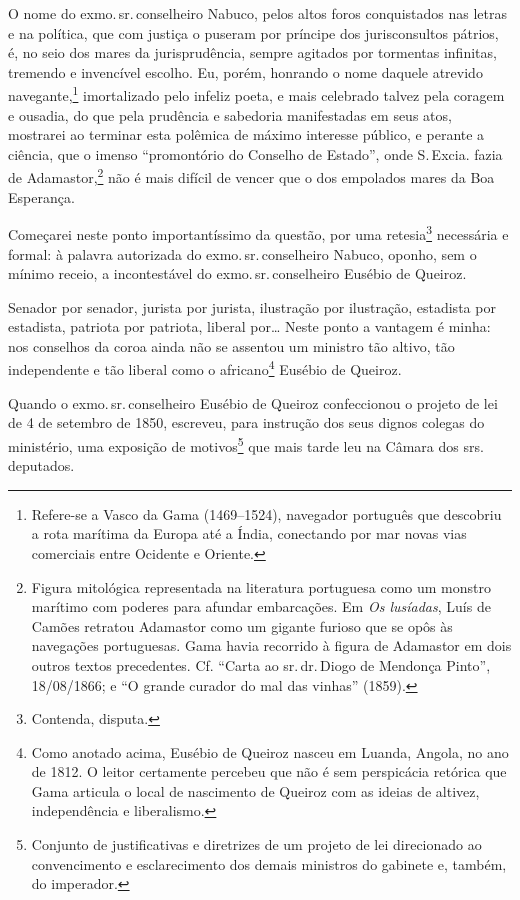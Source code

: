 O nome do exmo.\,sr.\,conselheiro Nabuco, pelos altos foros conquistados
nas letras e na política, que com justiça o puseram por príncipe dos
jurisconsultos pátrios, é, no seio dos mares da jurisprudência, sempre
agitados por tormentas infinitas, tremendo e invencível escolho. Eu,
porém, honrando o nome daquele atrevido navegante,\footnote{Refere-se a
  Vasco da Gama (1469--1524), navegador português que descobriu a rota
  marítima da Europa até a Índia, conectando por mar novas vias
  comerciais entre Ocidente e Oriente.} imortalizado pelo infeliz
poeta, e mais celebrado talvez pela coragem e ousadia, do que pela
prudência e sabedoria manifestadas em seus atos, mostrarei ao terminar
esta polêmica de máximo interesse público, e perante a ciência, que o
imenso ``promontório do Conselho de Estado'', onde S.\,Excia. fazia de
Adamastor,\footnote{Figura mitológica representada na literatura
  portuguesa como um monstro marítimo com poderes para afundar
  embarcações. Em \emph{Os lusíadas}, Luís de Camões retratou Adamastor
  como um gigante furioso que se opôs às navegações portuguesas. Gama
  havia recorrido à figura de Adamastor em dois outros textos
  precedentes. Cf. ``Carta ao sr.\,dr.\,Diogo de Mendonça Pinto'',
  18/08/1866; e ``O grande curador do mal das vinhas'' (1859).} não
é mais difícil de vencer que o dos empolados mares da Boa Esperança.

Começarei neste ponto importantíssimo da questão, por uma
retesia\footnote{Contenda, disputa.} necessária e formal: à palavra
autorizada do exmo.\,sr.\,conselheiro Nabuco, oponho, sem o mínimo receio,
a incontestável do exmo.\,sr.\,conselheiro Eusébio de Queiroz.

Senador por senador, jurista por jurista, ilustração por ilustração,
estadista por estadista, patriota por patriota, liberal por\ldots{} Neste
ponto a vantagem é minha: nos conselhos da coroa ainda não se assentou
um ministro tão altivo, tão independente e tão liberal como o
africano\footnote{Como anotado acima, Eusébio de Queiroz nasceu em
  Luanda, Angola, no ano de 1812. O leitor certamente percebeu que não é
  sem perspicácia retórica que Gama articula o local de nascimento de
  Queiroz com as ideias de altivez, independência e liberalismo.}
Eusébio de Queiroz.

Quando o exmo.\,sr.\,conselheiro Eusébio de Queiroz confeccionou o projeto
de lei de 4 de setembro de 1850, escreveu, para instrução dos seus
dignos colegas do ministério, uma exposição de motivos\footnote{
  Conjunto de justificativas e diretrizes de um projeto de lei
  direcionado ao convencimento e esclarecimento dos demais ministros do
  gabinete e, também, do imperador.} que mais tarde leu na Câmara dos
srs.\,deputados.

